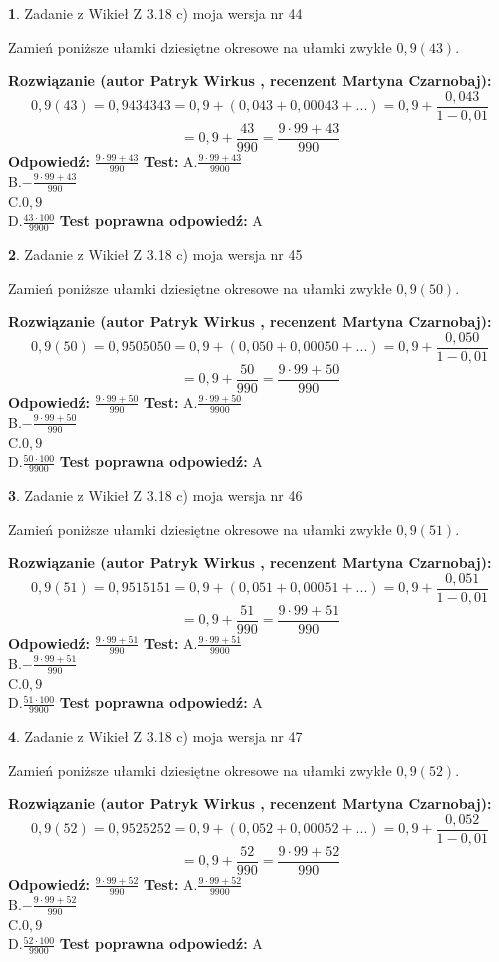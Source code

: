 \documentclass[12pt, a4paper]{article}
\theoremstyle{definition} %
\newtheorem{zad}{}
\newcommand{\zadStart}[1]{\begin{zad}#1\newline}
\newcommand{\zadStop}{\end{zad}}
\newcommand{\rozwStart}[2]{\noindent \textbf{Rozwiązanie (autor #1 , recenzent #2): }\newline}
\newcommand{\rozwStop}{\newline}
\newcommand{\odpStart}{\noindent \textbf{Odpowiedź:}\newline}
\newcommand{\odpStop}{\newline}
\newcommand{\testStart}{\noindent \textbf{Test:}\newline}
\newcommand{\testStop}{\newline}
\newcommand{\kluczStart}{\noindent \textbf{Test poprawna odpowiedź:}\newline}
\newcommand{\kluczStop}{\newline}
\begin{document}
\zadStart{Zadanie z Wikieł Z 3.18 c) moja wersja nr 44}

Zamień poniższe ułamki dziesiętne okresowe na ułamki zwykłe $0,9(43)$.
\zadStop
\rozwStart{Patryk Wirkus}{Martyna Czarnobaj}
$$0,9(43)=0,9434343=0,9+(0,043+0,00043+...)=0,9+\frac{0,043}{1-0,01}$$
$$=0,9+\frac{43}{990}=\frac{9\cdot99+43}{990}$$
\rozwStop
\odpStart
$\frac{9\cdot99+43}{990}$
\odpStop
\testStart
A.$\frac{9\cdot99+43}{9900}$\\ B.$-\frac{9\cdot99+43}{990}$\\ C.$0,9$\\ D.$\frac{43\cdot100}{9900}$
\testStop
\kluczStart
A
\kluczStop



\zadStart{Zadanie z Wikieł Z 3.18 c) moja wersja nr 45}

Zamień poniższe ułamki dziesiętne okresowe na ułamki zwykłe $0,9(50)$.
\zadStop
\rozwStart{Patryk Wirkus}{Martyna Czarnobaj}
$$0,9(50)=0,9505050=0,9+(0,050+0,00050+...)=0,9+\frac{0,050}{1-0,01}$$
$$=0,9+\frac{50}{990}=\frac{9\cdot99+50}{990}$$
\rozwStop
\odpStart
$\frac{9\cdot99+50}{990}$
\odpStop
\testStart
A.$\frac{9\cdot99+50}{9900}$\\ B.$-\frac{9\cdot99+50}{990}$\\ C.$0,9$\\ D.$\frac{50\cdot100}{9900}$
\testStop
\kluczStart
A
\kluczStop



\zadStart{Zadanie z Wikieł Z 3.18 c) moja wersja nr 46}

Zamień poniższe ułamki dziesiętne okresowe na ułamki zwykłe $0,9(51)$.
\zadStop
\rozwStart{Patryk Wirkus}{Martyna Czarnobaj}
$$0,9(51)=0,9515151=0,9+(0,051+0,00051+...)=0,9+\frac{0,051}{1-0,01}$$
$$=0,9+\frac{51}{990}=\frac{9\cdot99+51}{990}$$
\rozwStop
\odpStart
$\frac{9\cdot99+51}{990}$
\odpStop
\testStart
A.$\frac{9\cdot99+51}{9900}$\\ B.$-\frac{9\cdot99+51}{990}$\\ C.$0,9$\\ D.$\frac{51\cdot100}{9900}$
\testStop
\kluczStart
A
\kluczStop



\zadStart{Zadanie z Wikieł Z 3.18 c) moja wersja nr 47}

Zamień poniższe ułamki dziesiętne okresowe na ułamki zwykłe $0,9(52)$.
\zadStop
\rozwStart{Patryk Wirkus}{Martyna Czarnobaj}
$$0,9(52)=0,9525252=0,9+(0,052+0,00052+...)=0,9+\frac{0,052}{1-0,01}$$
$$=0,9+\frac{52}{990}=\frac{9\cdot99+52}{990}$$
\rozwStop
\odpStart
$\frac{9\cdot99+52}{990}$
\odpStop
\testStart
A.$\frac{9\cdot99+52}{9900}$\\ B.$-\frac{9\cdot99+52}{990}$\\ C.$0,9$\\ D.$\frac{52\cdot100}{9900}$
\testStop
\kluczStart
A
\kluczStop
\end{document}
